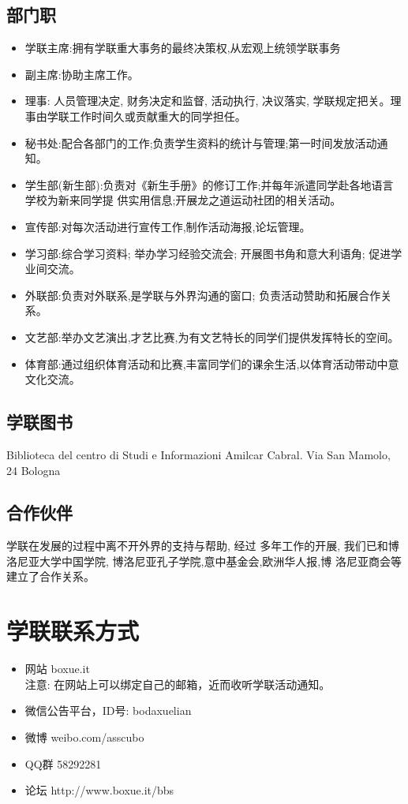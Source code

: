 \subsection{部门职}
\begin{itemize}
\item 学联主席:拥有学联重大事务的最终决策权,从宏观上统领学联事务
\item 副主席:协助主席工作。 
\item 理事: 人员管理决定, 财务决定和监督, 活动执行, 决议落实, 学联规定把关。理事由学联工作时间久或贡献重大的同学担任。
\item 秘书处:配合各部门的工作;负责学生资料的统计与管理;第一时间发放活动通知。
\item 学生部(新生部):负责对《新生手册》的修订工作;并每年派遣同学赴各地语言学校为新来同学提 供实用信息;开展龙之道运动社团的相关活动。
\item 宣传部:对每次活动进行宣传工作,制作活动海报,论坛管理。
\item 学习部:综合学习资料; 举办学习经验交流会; 开展图书角和意大利语角; 促进学业间交流。
\item 外联部:负责对外联系,是学联与外界沟通的窗口; 负责活动赞助和拓展合作关系。
\item 文艺部:举办文艺演出,才艺比赛,为有文艺特长的同学们提供发挥特长的空间。
\item 体育部:通过组织体育活动和比赛,丰富同学们的课余生活,以体育活动带动中意文化交流。 
\end{itemize}


\subsection{学联图书}
Biblioteca del centro di Studi e Informazioni Amilcar Cabral. Via San Mamolo, 24 Bologna


\subsection{合作伙伴}
学联在发展的过程中离不开外界的支持与帮助, 经过 多年工作的开展, 我们已和博洛尼亚大学中国学院, 博洛尼亚孔子学院,意中基金会,欧洲华人报,博 洛尼亚商会等建立了合作关系。 

\section{学联联系方式}
\begin{itemize}
\item 网站 boxue.it \\
注意: 在网站上可以绑定自己的邮箱，近而收听学联活动通知。
\item 微信公告平台，ID号: bodaxuelian
\item 微博 weibo.com/asscubo
\item QQ群 58292281
\item 论坛 http://www.boxue.it/bbs
\end{itemize}

